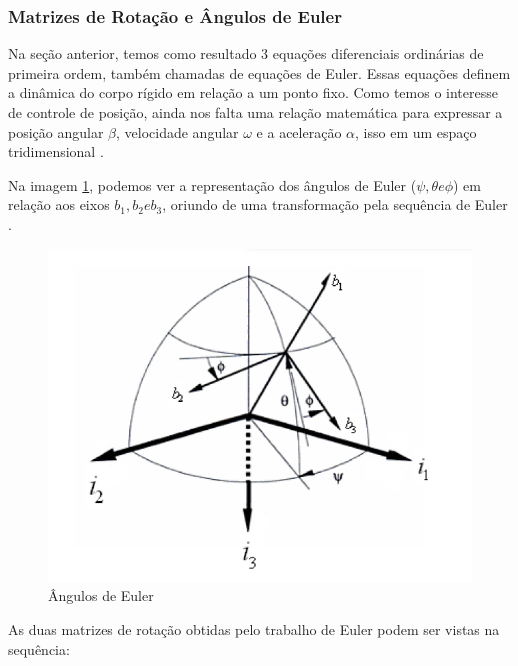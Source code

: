 \subsubsection{Matrizes de Rotação e Ângulos de Euler}

Na seção anterior, temos como resultado 3 equações diferenciais ordinárias de primeira ordem, também chamadas de equações de Euler. Essas equações definem a dinâmica do corpo rígido em relação a um ponto fixo. Como temos o interesse de controle de posição, ainda nos falta uma relação matemática para expressar a posição angular $\beta$, velocidade angular $\omega$ e a aceleração $\alpha$, isso em um espaço tridimensional \cite{Snider}.

Na imagem \ref{fig:coordenada}, podemos ver a representação dos ângulos de Euler ($\psi, \theta e \phi$) em relação aos eixos $b_1, b_2 e b_3$, oriundo de uma transformação pela sequência de Euler \cite{BongWie2001}.

\begin{figure}[!ht]
  \caption{Ângulos de Euler}
  \begin{center}
      \includegraphics[scale=0.5]{img/euler_snider_p28}
  \end{center}
  \label{fig:coordenada}
\end{figure}

As duas matrizes de rotação obtidas pelo trabalho de Euler podem ser vistas na sequência: 

